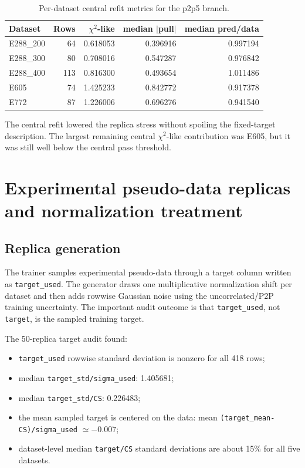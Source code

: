 \documentclass[11pt]{article}
\newcommand{\chisq}{\chi^2}
\newcommand{\code}[1]{\texttt{#1}}
\begin{document}
\begin{table}[H]
\centering
\caption{Per-dataset central refit metrics for the p2p5 branch.}
\label{tab:centraldataset}
\begin{tabular}{lrrrr}
\toprule
Dataset & Rows & $\chisq$-like & median $|$pull$|$ & median pred/data \\
\midrule
E288\_200 & 64  & 0.618053 & 0.396916 & 0.997194 \\
E288\_300 & 80  & 0.708016 & 0.547287 & 0.976842 \\
E288\_400 & 113 & 0.816300 & 0.493654 & 1.011486 \\
E605      & 74  & 1.425233 & 0.842772 & 0.917378 \\
E772      & 87  & 1.226006 & 0.696276 & 0.941540 \\
\bottomrule
\end{tabular}
\end{table}

The central refit lowered the replica stress without spoiling the fixed-target description.  The largest remaining central $\chisq$-like contribution was E605, but it was still well below the central pass threshold.

\section{Experimental pseudo-data replicas and normalization treatment}
\label{sec:replicas}

\subsection{Replica generation}

The trainer samples experimental pseudo-data through a target column written as \code{target\_used}.  The generator draws one multiplicative normalization shift per dataset and then adds rowwise Gaussian noise using the uncorrelated/P2P training uncertainty.  The important audit outcome is that \code{target\_used}, not \code{target}, is the sampled training target.

The 50-replica target audit found:
\begin{itemize}
  \item \code{target\_used} rowwise standard deviation is nonzero for all 418 rows;
  \item median \code{target\_std/sigma\_used}: 1.405681;
  \item median \code{target\_std/CS}: 0.226483;
  \item the mean sampled target is centered on the data: mean \code{(target\_mean-CS)/sigma\_used} $\simeq -0.007$;
  \item dataset-level median \code{target/CS} standard deviations are about 15\% for all five datasets.
\end{itemize}
\end{document}

